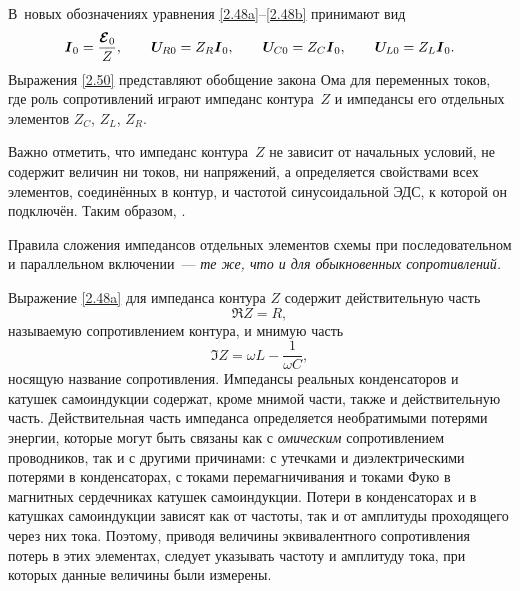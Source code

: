 В~новых обозначениях уравнения \eqref{2.48a}--\eqref{2.48b} принимают вид
\begin{equation}
	\eqmark{2.50}
	\vec I_0=\frac{\vec{\mathcal{E}}_0}{Z}, \qquad \vec{U}_{\! R0}=Z_R\vec I_0, \qquad 
    \vec{U}_{\! C0}=Z_C\vec I_0, \qquad \vec{U}_{\! L0}=Z_L\vec I_0.
\end{equation}
Выражения \eqref{2.50} представляют обобщение закона Ома для переменных токов,
где роль сопротивлений играют импеданс контура~$Z$ и импедансы
его отдельных элементов $Z_C$, $Z_L$, $Z_R$. 

Важно отметить, что импеданс контура~$Z$ не зависит от начальных условий, не
содержит величин ни токов, ни напряжений, а определяется свойствами всех
элементов, соединённых в контур, и частотой синусоидальной ЭДС, к которой он
подключён. Таким образом, .


Правила сложения импедансов отдельных элементов схемы при
последовательном и параллельном включении~--- \emph{те же, что и для обыкновенных
сопротивлений.}

Выражение \eqref{2.48a} для импеданса контура $Z$ содержит действительную часть 
\begin{equation*}
\Re Z=R,
\end{equation*}
называемую  сопротивлением контура, 
и мнимую часть 
\begin{equation*}
\Im Z=\omega L-\frac1{\omega C}, 
\end{equation*}
носящую название 
 сопротивления.
Импедансы реальных конденсаторов и катушек самоиндукции содержат, кроме мнимой
части, также и действительную часть. Действительная часть импеданса определяется
необратимыми потерями энергии, которые могут быть связаны как с \emph{омическим}
сопротивлением проводников, так и с другими причинами: с утечками и
диэлектрическими потерями в конденсаторах, с токами перемагничивания и токами
Фуко в магнитных сердечниках катушек самоиндукции. Потери в конденсаторах и в
катушках самоиндукции зависят как от частоты, так и от амплитуды проходящего
через них тока. Поэтому, приводя величины эквивалентного сопротивления потерь в
этих элементах, следует указывать частоту и амплитуду тока, при которых данные
величины были измерены.

